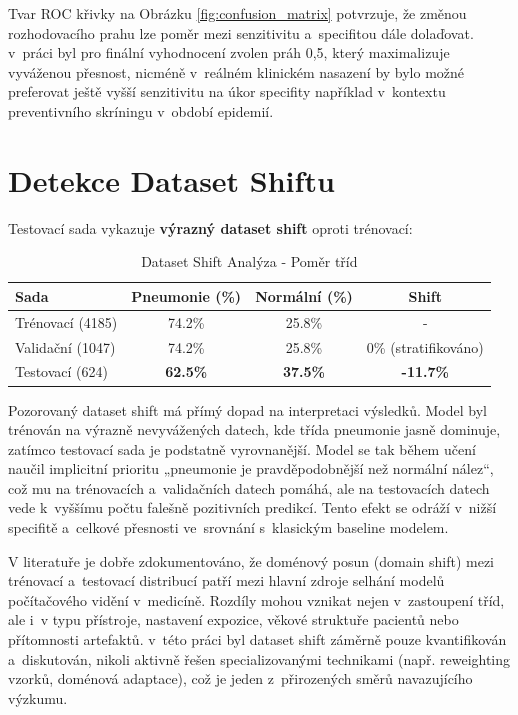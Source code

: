 \documentclass[12pt, a4paper]{report}
\begin{document}
Tvar ROC křivky na Obrázku \ref{fig:confusion_matrix} potvrzuje, že změnou rozhodovacího prahu lze poměr mezi senzitivitu a~specifitou dále dolaďovat.\cite{data_encoding_review} v~práci byl pro finální vyhodnocení zvolen práh 0{,}5, který maximalizuje vyváženou přesnost, nicméně v~reálném klinickém nasazení by bylo možné preferovat ještě vyšší senzitivitu na úkor specifity například v~kontextu preventivního skríningu v~období epidemií.


\section{Detekce Dataset Shiftu}
Testovací sada vykazuje \textbf{výrazný dataset shift} oproti trénovací:

\begin{table}[h]
    \centering
    \caption{Dataset Shift Analýza - Poměr tříd}
    \label{tab:dataset_shift}
    \begin{tabular}{|l|c|c|c|}
        \hline
        \textbf{Sada} & \textbf{Pneumonie (\%)} & \textbf{Normální (\%)} & \textbf{Shift} \\
        \hline
        Trénovací (4185) & 74.2\% & 25.8\% & - \\
        Validační (1047) & 74.2\% & 25.8\% & 0\% (stratifikováno) \\
        Testovací (624) & \textbf{62.5\%} & \textbf{37.5\%} & \textbf{-11.7\%} \\
        \hline
    \end{tabular}
\end{table}

Pozorovaný dataset shift má přímý dopad na interpretaci výsledků. Model byl trénován na výrazně nevyvážených datech, kde třída pneumonie jasně dominuje, zatímco testovací sada je podstatně vyrovnanější.\cite{chest_xray_diagnosis} Model se tak během učení naučil implicitní prioritu „pneumonie je pravděpodobnější než normální nález“, což mu na trénovacích a~validačních datech pomáhá, ale na testovacích datech vede k~vyššímu počtu falešně pozitivních predikcí. Tento efekt se odráží v~nižší specifitě a~celkové přesnosti ve~srovnání s~klasickým baseline modelem. 

V literatuře je dobře zdokumentováno, že doménový posun (domain shift) mezi trénovací a~testovací distribucí patří mezi hlavní zdroje selhání modelů počítačového vidění v~medicíně.\cite{domain_shift_chestxray} Rozdíly mohou vznikat nejen v~zastoupení tříd, ale i~v typu přístroje, nastavení expozice, věkové struktuře pacientů nebo přítomnosti artefaktů. v~této práci byl dataset shift záměrně pouze kvantifikován a~diskutován, nikoli aktivně řešen specializovanými technikami (např. reweighting vzorků, doménová adaptace), což je jeden z~přirozených směrů navazujícího výzkumu.
\end{document}
